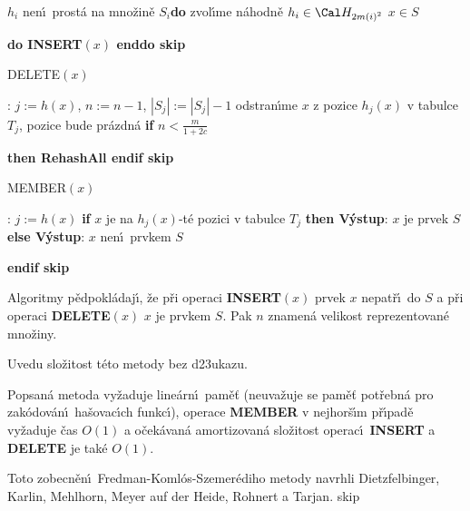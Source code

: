 \phantom{---}{\bf while} $h_i$ nen\'\i\ prost\'a na mno\v zin\v e $
S_i${\bf do}\newline
\phantom{------}zvol\'\i me n\'ahodn\v e $h_i\in \Cal H_{2m\left(i\right)^2}$\newline
\phantom{---}{\bf enddo\newline 
enddo\newline 
for every} $x\in S$ {\bf do INSERT$\left(x\right)$ enddo
skip

\flushpar DELETE$\left(x\right)$}:\newline 
$j:=h\left(x\right)$, $n:=n-1$, $|S_j|:=|S_j|-1$\newline 
odstran\'\i me $x$ z pozice $h_j\left(x\right)$ v tabulce $T_j$, pozice bude pr\'azdn\'a \newline 
{\bf if} $n<\frac m{1+2c}$ {\bf then RehashAll endif
skip

\flushpar MEMBER$\left(x\right)$}: \newline 
$j:=h\left(x\right)$\newline 
{\bf if} $x$ je na $h_j\left(x\right)$-t\'e pozici v tabulce $T_j$ {\bf then\newline 
\phantom{{\rm ---}}V\'ystup}: $x$ je prvek $S$ \newline 
{\bf else\newline 
\phantom{{\rm ---}}V\'ystup}: $x$ nen\'\i\ prvkem $S$\newline 
{\bf endif
skip

}\flushpar Algoritmy p\v edpokl\'adaj\'\i , \v ze p\v ri operaci {\bf INSERT$
\left(x\right)$  }
prvek $x$ nepat\v r\'\i\ do $S$ a p\v ri operaci {\bf DELETE$\left(x\right)$} $
x$ je prvkem $S$. 
Pak $n$ znamen\'a velikost reprezentovan\'e mno\v ziny. 
\medskip

\flushpar Uvedu slo\v zitost t\'eto metody bez d\accent23ukazu.
\medskip

Popsan\'a metoda vy\v zaduje line\'arn\'\i\ pam\v e\v t 
(neuva\v zuje se pam\v e\v t pot\v rebn\'a pro zak\'odo\-v\'a\-n\'\i\ ha\v sovac\'\i ch funkc\'\i ), operace {\bf MEMBER }
v nej\-hor\v s\'\i m p\v r\'\i pad\v e vy\v zaduje \v cas $O\left(1\right)$ a o\v cek\'avan\'a 
amortizovan\'a slo\v zitost operac\'\i\ {\bf INSERT} a {\bf DELETE} je tak\'e $
O\left(1\right)$.
\endproclaim

\flushpar Toto zobecn\v en\'\i\ Fredman-Koml\'os-Szemer\'ediho metody navrhli 
Dietzfelbinger, Karlin, Mehl\-horn, Meyer auf der Heide, Rohnert 
a Tarjan.
skip

